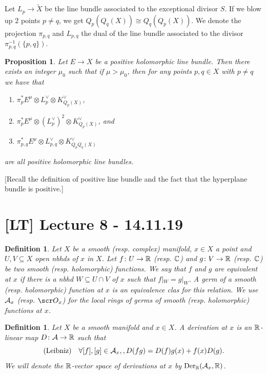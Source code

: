 \documentclass[A4paper, british]{amsart}
\theoremstyle{darkgreentheorem}
\newtheorem{prop}[thm]{Proposition}
\theoremstyle{darkbluedefinition}
\newtheorem{defn}[thm]{Definition}
\theoremstyle{darkredexample}
\theoremstyle{remark}
\DeclareMathOperator{\Der}{Der}
\newcommand{\1}{\mathbbm{1}}
\newcommand{\ot}{\otimes}
\newcommand{\dual}{^{\vee}}
\newcommand{\sub}{\subseteq}
\begin{document}
Let $L_{p}\to \tilde{X}$ be the line bundle associated to the exceptional divisor $S$.
If we blow up $2$ points $p\neq q$, we get $Q_{p}(Q_{q}(X))\cong Q_{q}(Q_{p}(X))$.
We denote the projection $\pi_{p,q}$ and $L_{p,q}$ the dual of the line bundle associated to the divisor $\pi_{p,q}^{-1}(\{p,q\})$.

\begin{prop}
    Let $E\to X$ be a positive holomorphic line bundle.
    Then there exists an integer $\mu_{0}$ such that if $\mu >\mu_{0}$, then for any points $p,q\in X$ with $p\neq q$ we have that
    \begin{enumerate}
	\item $\pi_{p}^{*}E^{\mu}\ot L_{p}\dual \ot K_{Q_{p}(X)}\dual $,
	\item $\pi_{p}^{*}E^{\mu}\ot (L_{p}\dual)^{2}\ot K_{Q_{p}(X)}\dual $, and
	\item $\pi_{p,q}^{*}E^{\mu}\ot L_{p,q}\dual \ot K_{Q_{p}Q_{q}(X)}\dual $
    \end{enumerate}
    are all positive holomorphic line bundles.
\end{prop}

[Recall the definition of positive line bundle and the fact that the hyperplane bundle is positive.]

\section{[LT] Lecture 8 - 14.11.19}

\begin{defn}
    Let $X$ be a smooth (resp. complex) manifold, $x\in X$ a point and $U,V\sub X$ open nbhds of $x$ in $X$.
    Let $f\colon U\to \mathbb{R}$ (resp. $\mathbb{C}$) and $g\colon V\to \mathbb{R}$ (resp. $\mathbb{C}$) be two smooth (resp. holomorphic) functions.
    We say that $f$ and $g$ are equivalent at $x$ if there is a nbhd $W\subseteq U\cap V$ of $x$ such that $f|_{W}=g|_{W}$.
    A \textit{germ of a smooth (resp. holomorphic) function} at $x$ is an equivalence clas for this relation.
    We use $\mathcal{A}_{x}$ (resp. $\O_{x}$) for the local rings of germs of smooth (resp. holomorphic) functions at $x$.
\end{defn}

\begin{defn}
    Let $X$ be a smooth manifold and $x\in X$.
    A \textit{derivation at $x$} is an $\mathbb{R}$-linear map $D\colon \mathcal{A}\to \mathbb{R}$ such that
    \[ \text{(Leibniz)} \quad \forall [f],[g]\in \mathcal{A}_{x},, D(fg)=D(f)g(x)+f(x)D(g).\]
    We will denote the $\mathbb{R}$-vector space of derivations at $x$ by $\Der_{\R}(\calA_{x},\R)$.
\end{defn}
\end{document}
